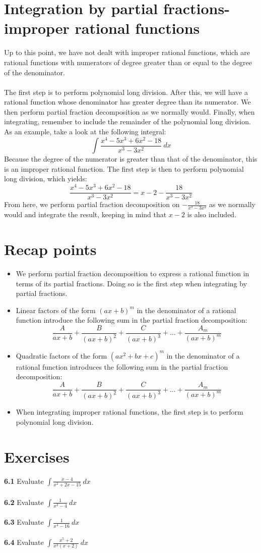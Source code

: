 \documentclass[11pt]{scrartcl}
\begin{document}
\section{Integration by partial fractions-improper rational functions}
\noindent 
Up to this point, we have not dealt with improper rational functions, which are rational functions with numerators of degree greater than or equal to the degree of the denominator. \\
\\
\noindent 
The first step is to perform polynomial long division. After this, we will have a rational function whose denominator has greater degree than its numerator. We then perform partial fraction decomposition as we normally would. Finally, when integrating, remember to include the remainder of the polynomial long division.
\noindent 
As an example, take a look at the following integral: 
$$\int{\frac{x^4-5x^3+6x^2-18}{x^3-3x^2} \ dx}$$
\noindent 
Because the degree of the numerator is greater than that of the denominator, this is an improper rational function. The first step is then to perform polynomial long division, which yields: 
$$\frac{x^4-5x^3+6x^2-18}{x^3-3x^2}=x-2-\frac{18}{x^3-3x^2}$$
\noindent 
From here, we perform partial fraction decomposition on $-\frac{18}{x^3-3x^2}$ as we normally would and integrate the result, keeping in mind that $x-2$ is also included.
\section{Recap points}
\begin{itemize}
    \item We perform partial fraction decomposition to express a rational function in terms of its partial fractions. Doing so is the first step when integrating by partial fractions. 
    \item Linear factors of the form $(ax+b)^m$ in the denominator of a rational function introduce the following sum in the partial fraction decomposition: 
    $$\frac{A}{ax+b}+\frac{B}{(ax+b)^2}+\frac{C}{(ax+b)^3}+...+\frac{A_m}{(ax+b)^m}$$
    \item Quadratic factors of the form $(ax^2+bx+c)^m$ in the denominator of a rational function introduces the following sum in the partial fraction decomposition: 
    $$\frac{A}{ax+b}+\frac{B}{(ax+b)^2}+\frac{C}{(ax+b)^3}+...+\frac{A_m}{(ax+b)^m}$$
    \item When integrating improper rational functions, the first step is to perform polynomial long division. 
\end{itemize}
\section{Exercises} 
\noindent 
\textbf{6.1} Evaluate $\int{\frac{x-4}{x^2+2x-15} \ dx}$ \\
\\
\noindent 
\textbf{6.2} Evaluate $\int{\frac{1}{x^2-4}} \ dx$ \\
\\
\noindent 
\textbf{6.3} Evaluate $\int{\frac{1}{x^4-16} \ dx}$\\
\\
\noindent 
\textbf{6.4} Evaluate $\int{\frac{x^5+2}{x^3(x+2)}} \ dx$
\end{document}
